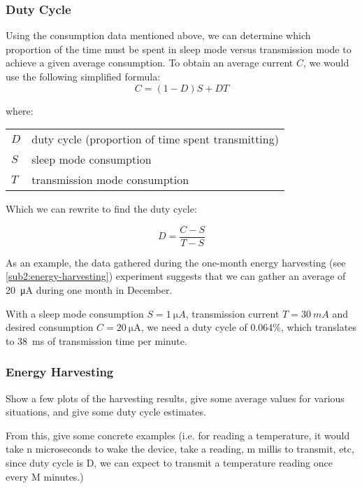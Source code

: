 \subsubsection{Duty Cycle}

Using the consumption data mentioned above, we can determine which proportion of
the time must be spent in sleep mode versus transmission mode to achieve a given
average consumption. To obtain an average current $C$, we would use the
following simplified formula:
\begin{equation*}
  C = (1 - D) S + D T
\end{equation*}

where:

\begin{tabular}[h!]{ll}
$D$   & duty cycle (proportion of time spent transmitting)  \\
$S$   & sleep mode consumption  \\
$T$   & transmission mode consumption \\
\end{tabular}

Which we can rewrite to find the duty cycle:

\begin{equation*}
  D = \frac{C-S}{T-S}
\end{equation*}

As an example, the data gathered during the one-month energy harvesting (see
\autoref{sub2:energy-harvesting}) experiment suggests that we can gather an
average of \SI{20}{\micro\ampere} during one month in December. 

With a sleep mode consumption $S = \SI{1}{\micro{}A}$, transmission current $T = 
\SI{30}{mA}$ and desired consumption $C = \SI{20}{\micro\ampere}$, we need a duty
cycle of 0.064\%, which translates to \SI{38}{ms} of transmission time per
minute.



\subsubsection{Energy Harvesting}\label{sub2:energy-harvesting}


Show a few plots of the harvesting results, give some average values for various
situations, and give some duty cycle estimates.

From this, give some concrete examples (i.e. for reading a temperature, it would
take n microseconds to wake the device, take a reading, m millis to transmit,
etc, since duty cycle is D, we can expect to transmit a temperature reading once
every M minutes.)

